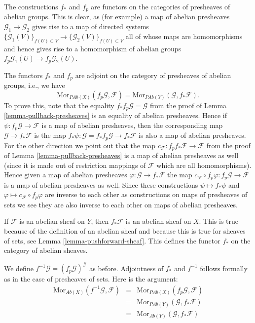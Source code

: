 \medskip\noindent
The constructions $f_*$ and $f_p$ are functors on
the categories of presheaves of abelian groups.
This is clear, as (for example) a map of abelian presheaves
$\mathcal{G}_1 \to \mathcal{G}_2$ gives rise to a map of
directed systems
$\{\mathcal{G}_1(V)\}_{f(U) \subset V} \to 
\{\mathcal{G}_2(V)\}_{f(U) \subset V}$
all of whose maps are homomorphisms
and hence gives rise to a homomorphism of abelian groups
$f_p\mathcal{G}_1(U) \to f_p\mathcal{G}_2(U)$.

\medskip\noindent
The functors $f_*$ and $f_p$ are adjoint on the
category of presheaves of abelian groups, i.e., we have
$$
\text{Mor}_{\textit{PAb}(X)}(f_p\mathcal{G}, \mathcal{F})
=
\text{Mor}_{\textit{PAb}(Y)}(\mathcal{G}, f_*\mathcal{F}).
$$
To prove this, note that the equality
$f_* f_p\mathcal{G} = \mathcal{G}$ from the proof
of Lemma \ref{lemma-pullback-presheaves}
is an equality of abelian presheaves. Hence if
$\psi : f_p\mathcal{G} \to \mathcal{F}$
is a map of abelian presheaves, then the corresponding map
$\mathcal{G} \to f_*\mathcal{F}$ is the map
$f_*\psi : \mathcal{G} = f_* f_p \mathcal{G} \to f_* \mathcal{F}$
is also a map of abelian presheaves. For the other direction
we point out that the map
$c_{\mathcal{F}} : f_p f_* \mathcal{F} \to \mathcal{F}$
from the proof of Lemma \ref{lemma-pullback-presheaves} is a
map of abelian presheaves as well (since it is made out of restriction
mappings of $\mathcal{F}$ which are all homomorphisms). Hence
given a map of abelian presheaves $\varphi : \mathcal{G} \to f_*\mathcal{F}$
the map
$c_{\mathcal{F}} \circ f_p\varphi : f_p\mathcal{G} \to \mathcal{F}$
is a map of abelian presheaves as well. Since these constructions
$\psi \mapsto f_*\psi$ and $\varphi \mapsto c_{\mathcal{F}} \circ f_p\varphi$
are inverse to each other as constructions on maps of presheaves of sets
we see they are also inverse to each other on maps of abelian presheaves.

\medskip\noindent
If $\mathcal{F}$ is an abelian sheaf on $Y$, then $f_*\mathcal{F}$
is an abelian sheaf on $X$. This is true because of the definition
of an abelian sheaf and because this is true for sheaves of sets,
see Lemma \ref{lemma-pushforward-sheaf}. This defines the functor
$f_*$ on the category of abelian sheaves.

\medskip\noindent
We define $f^{-1}\mathcal{G} = (f_p\mathcal{G})^\#$ as before.
Adjointness of $f_*$ and $f^{-1}$ follows formally as in
the case of presheaves of sets. Here is the argument:
\begin{eqnarray*}
\text{Mor}_{\textit{Ab}(X)}(f^{-1}\mathcal{G}, \mathcal{F})
& = &
\text{Mor}_{\textit{PAb}(X)}(f_p\mathcal{G}, \mathcal{F}) \\
& = &
\text{Mor}_{\textit{PAb}(Y)}(\mathcal{G}, f_*\mathcal{F}) \\
& = &
\text{Mor}_{\textit{Ab}(Y)}(\mathcal{G}, f_*\mathcal{F})
\end{eqnarray*}

